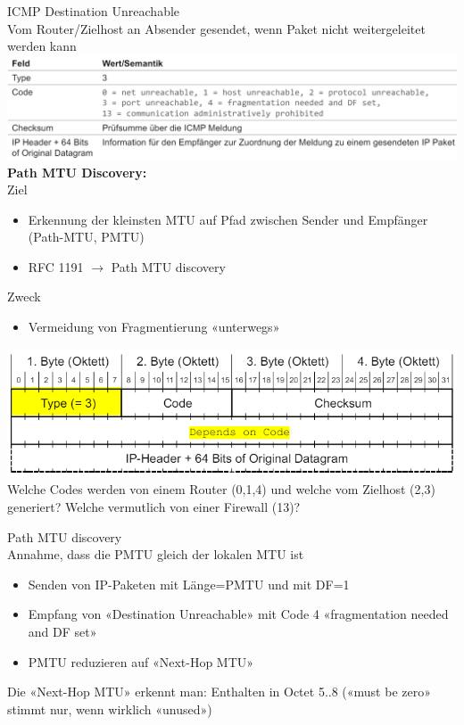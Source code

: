 \begin{definition}{ICMP Destination Unreachable}\\
    Vom Router/Zielhost an Absender gesendet, wenn Paket nicht weitergeleitet werden kann\\
        \includegraphics[width=1\linewidth]{images/destination_unreachable.png}\\
    \textbf{Path MTU Discovery:}\\
    Ziel
    \begin{itemize}
        \item Erkennung der kleinsten MTU auf Pfad zwischen Sender und Empfänger (Path-MTU, PMTU)
        \item RFC 1191 $\rightarrow$ Path MTU discovery
    \end{itemize}
    Zweck
    \begin{itemize}
        \item Vermeidung von Fragmentierung «unterwegs»
    \end{itemize}
\end{definition}

\begin{example}
        \includegraphics[width=0.75\linewidth]{images/dest_unreachable_ex1.png}\\
    Welche Codes werden von einem Router (0,1,4) und welche vom Zielhost (2,3) generiert?
    Welche vermutlich von einer Firewall (13)?
\end{example}

\begin{KR}{Path MTU discovery}\\
    Annahme, dass die PMTU gleich der lokalen MTU ist
    \begin{itemize}
        \item Senden von IP-Paketen mit Länge=PMTU und mit DF=1
        \item Empfang von «Destination Unreachable» mit Code 4 «fragmentation needed and DF set»
        \item PMTU reduzieren auf «Next-Hop MTU»
    \end{itemize}
    Die «Next-Hop MTU» erkennt man: Enthalten in Octet 5..8 («must be zero» stimmt nur, wenn wirklich «unused»)
\end{KR}

